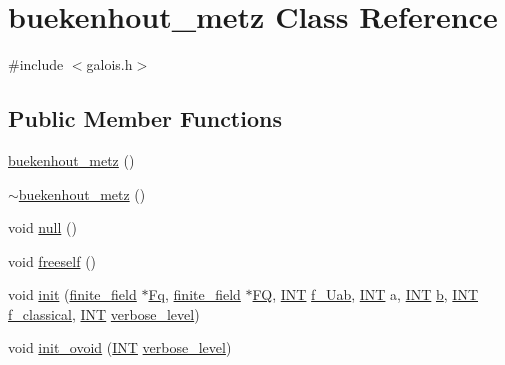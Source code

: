 \hypertarget{classbuekenhout__metz}{}\section{buekenhout\+\_\+metz Class Reference}
\label{classbuekenhout__metz}


{\ttfamily \#include $<$galois.\+h$>$}

\subsection*{Public Member Functions}
\begin{DoxyCompactItemize}
\item 
\mbox{\hyperlink{classbuekenhout__metz_a7d7e3cf921b815313faecf969d5432ca}{buekenhout\+\_\+metz}} ()
\item 
\mbox{\hyperlink{classbuekenhout__metz_ae8b5b0708d5fdc40b45334d3bf9fd996}{$\sim$buekenhout\+\_\+metz}} ()
\item 
void \mbox{\hyperlink{classbuekenhout__metz_aace9e1882235a2f14602398dc42173c4}{null}} ()
\item 
void \mbox{\hyperlink{classbuekenhout__metz_a9af576e3e80d9d96934c763b7a5be154}{freeself}} ()
\item 
void \mbox{\hyperlink{classbuekenhout__metz_a9a784ac5ef293953fbf1c53419c6d02b}{init}} (\mbox{\hyperlink{classfinite__field}{finite\+\_\+field}} $\ast$\mbox{\hyperlink{classbuekenhout__metz_ab26b9a884b3a8fc87cb479ad9ec93da9}{Fq}}, \mbox{\hyperlink{classfinite__field}{finite\+\_\+field}} $\ast$\mbox{\hyperlink{classbuekenhout__metz_a2949842c3c28b19a1abc557c342af377}{FQ}}, \mbox{\hyperlink{galois_8h_a09fddde158a3a20bd2dcadb609de11dc}{I\+NT}} \mbox{\hyperlink{classbuekenhout__metz_a8e827f49589c4719bacd4dd5508176a3}{f\+\_\+\+Uab}}, \mbox{\hyperlink{galois_8h_a09fddde158a3a20bd2dcadb609de11dc}{I\+NT}} a, \mbox{\hyperlink{galois_8h_a09fddde158a3a20bd2dcadb609de11dc}{I\+NT}} \mbox{\hyperlink{alphabet2_8_c_a148e3876077787926724625411d6e7a9}{b}}, \mbox{\hyperlink{galois_8h_a09fddde158a3a20bd2dcadb609de11dc}{I\+NT}} \mbox{\hyperlink{classbuekenhout__metz_a7deb870cccba8d68a5bc547b9dfbe856}{f\+\_\+classical}}, \mbox{\hyperlink{galois_8h_a09fddde158a3a20bd2dcadb609de11dc}{I\+NT}} \mbox{\hyperlink{simeon_8_c_a818073fbcc2f439e7c56952f67386122}{verbose\+\_\+level}})
\item 
void \mbox{\hyperlink{classbuekenhout__metz_a217d76a8e2385ce176c4c461085ab065}{init\+\_\+ovoid}} (\mbox{\hyperlink{galois_8h_a09fddde158a3a20bd2dcadb609de11dc}{I\+NT}} \mbox{\hyperlink{simeon_8_c_a818073fbcc2f439e7c56952f67386122}{verbose\+\_\+level}})

\end{DoxyCompactItemize}
